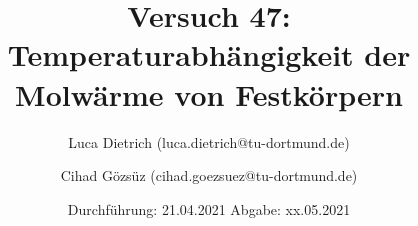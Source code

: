 

\subject{Fortgeschrittenenpraktikum der Fakultät Physik}
\title{Versuch 47: Temperaturabhängigkeit der Molwärme von Festkörpern}
\author{Luca Dietrich (luca.dietrich@tu-dortmund.de) \and Cihad Gözsüz (cihad.goezsuez@tu-dortmund.de)}
\date{%
  Durchführung: 21.04.2021
  \hspace{3em}
  Abgabe: xx.05.2021
}
\publishers{TU Dortmund – Fakultät Physik}


\maketitle
\thispagestyle{empty}
\tableofcontents
\newpage





\newpage
\printbibliography{}


